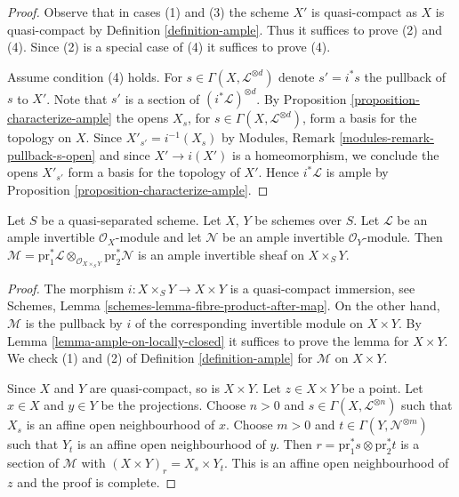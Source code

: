 \begin{proof}
Observe that in cases (1) and (3) the scheme $X'$ is quasi-compact
as $X$ is quasi-compact by Definition \ref{definition-ample}.
Thus it suffices to prove (2) and (4). Since (2) is a special case
of (4) it suffices to prove (4).

\medskip\noindent
Assume condition (4) holds. For $s \in \Gamma(X, \mathcal{L}^{\otimes d})$
denote $s' = i^*s$ the pullback of $s$ to $X'$. Note that
$s'$ is a section of $(i^*\mathcal{L})^{\otimes d}$. By
Proposition \ref{proposition-characterize-ample}
the opens $X_s$, for $s \in \Gamma(X, \mathcal{L}^{\otimes d})$,
form a basis for the topology on $X$. Since $X'_{s'} = i^{-1}(X_s)$ by
Modules, Remark \ref{modules-remark-pullback-s-open}
and since $X' \to i(X')$ is a homeomorphism, we conclude
the opens $X'_{s'}$ form a basis for the topology of $X'$. Hence
$i^*\mathcal{L}$ is ample by
Proposition \ref{proposition-characterize-ample}.
\end{proof}

\begin{lemma}
\label{lemma-ample-on-product}
Let $S$ be a quasi-separated scheme. Let $X$, $Y$ be schemes over $S$.
Let $\mathcal{L}$ be an ample invertible $\mathcal{O}_X$-module
and let $\mathcal{N}$ be an ample invertible $\mathcal{O}_Y$-module.
Then $\mathcal{M} = \text{pr}_1^*\mathcal{L}
\otimes_{\mathcal{O}_{X \times_S Y}} \text{pr}_2^*\mathcal{N}$
is an ample invertible sheaf on $X \times_S Y$.
\end{lemma}

\begin{proof}
The morphism $i : X \times_S Y \to X \times Y$ is a quasi-compact
immersion, see Schemes, Lemma \ref{schemes-lemma-fibre-product-after-map}.
On the other hand, $\mathcal{M}$ is the pullback by
$i$ of the corresponding invertible module on $X \times Y$.
By Lemma \ref{lemma-ample-on-locally-closed} it suffices to prove the
lemma for $X \times Y$. We check (1) and (2) of
Definition \ref{definition-ample} for $\mathcal{M}$ on $X \times Y$.

\medskip\noindent
Since $X$ and $Y$ are quasi-compact, so is $X \times Y$.
Let $z \in X \times Y$ be a point. Let $x \in X$ and $y \in Y$
be the projections. Choose $n > 0$ and
$s \in \Gamma(X, \mathcal{L}^{\otimes n})$
such that $X_s$ is an affine open neighbourhood of $x$.
Choose $m > 0$ and
$t \in \Gamma(Y, \mathcal{N}^{\otimes m})$
such that $Y_t$ is an affine open neighbourhood of $y$.
Then $r = \text{pr}_1^*s \otimes \text{pr}_2^*t$ is a section
of $\mathcal{M}$ with $(X \times Y)_r = X_s \times Y_t$.
This is an affine open neighbourhood of $z$ and the proof is complete.
\end{proof}












